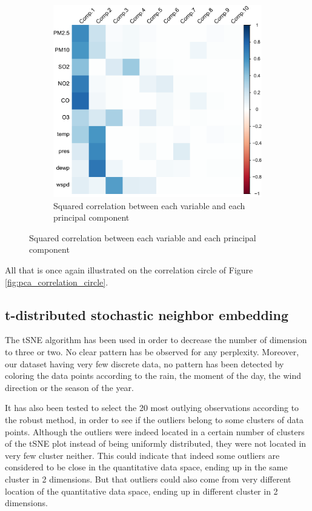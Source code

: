\documentclass[a4paper, 12pt]{article}
\begin{document}
\begin{figure}[h]
\begin{subfigure}{0.48\textwidth}
            \includegraphics[width=\textwidth]{resources/pdf/pca_explained_variability.pdf}
            \caption{Squared correlation between each variable and each principal component}
            \label{fig:pca_explained_variability}
        \end{subfigure}
    \end{figure}

    All that is once again illustrated on the correlation circle of Figure \ref{fig:pca_correlation_circle}.

    \subsection{t-distributed stochastic neighbor embedding}
    \label{tSNE}

    The tSNE algorithm has been used in order to decrease the number of dimension to three or two. No clear pattern has be observed for any perplexity. 
    Moreover, our dataset having very few discrete data, no pattern has been detected by coloring the data points according to the rain, the moment of the day, the wind direction or the season of the year.

    It has also been tested to select the 20 most outlying observations according to the robust method, in order to see if the outliers belong to some clusters of data points. Although the outliers were indeed located in a certain number of clusters of the tSNE plot instead of being uniformly distributed, they were not located in very few cluster neither. 
    This could indicate that indeed some outliers are considered to be close in the quantitative data space, ending up in the same cluster in 2 dimensions. But that outliers could also come from very different location of the quantitative data space, ending up in different cluster in 2 dimensions.
\end{document}
